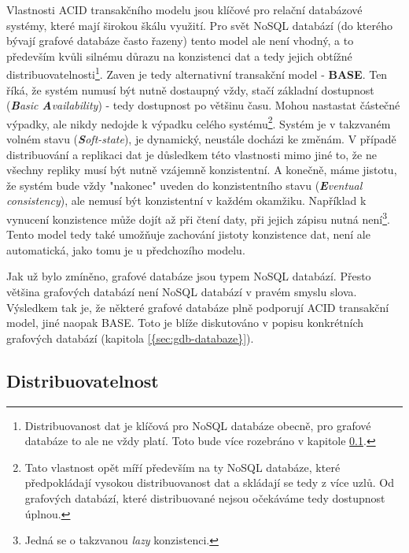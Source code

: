 Vlastnosti ACID transakčního modelu jsou klíčové pro relační databázové systémy, které mají širokou škálu využití. Pro svět NoSQL databází (do kterého bývají grafové databáze často řazeny) tento model ale není vhodný, a to především kvůli silnému důrazu na konzistenci dat a tedy jejich obtížné distribuovatelnosti\footnote{Distribuovanost dat je klíčová pro NoSQL databáze obecně, pro grafové databáze to ale ne vždy platí. Toto bude více rozebráno v kapitole \ref{sec:gdb-distribution}.}. Zaven je tedy alternativní transakční model - \textbf{BASE}. Ten říká, že systém numusí být nutně dostaupný vždy, stačí základní dostupnost (\textit{\textbf{B}asic \textbf{A}vailability}) - tedy dostupnost po většinu času. Mohou nastastat částečné výpadky, ale nikdy nedojde k výpadku celého systému\footnote{Tato vlastnost opět míří především na ty NoSQL databáze, které předpokládají vysokou distribuovanost dat a skládají se tedy z více uzlů. Od grafových databází, které distribuované nejsou očekáváme tedy dostupnost úplnou.}. Systém je v takzvaném volném stavu (\textit{\textbf{S}oft-state}), je dynamický, neustále docházi ke změnám. V případě distribuování a replikaci dat je důsledkem této vlastnosti mimo jiné to, že ne všechny repliky musí být nutně vzájemně konzistentní. A konečně, máme jistotu, že systém bude vždy "nakonec" uveden do konzistentního stavu (\textit{\textbf{E}ventual consistency}), ale nemusí být konzistentní v každém okamžiku. Například k vynucení konzistence může dojít až při čtení daty, při jejich zápisu nutná není\footnote{Jedná se o takzvanou \textit{lazy} konzistenci.}. Tento model tedy také umožňuje zachování jistoty konzistence dat, není ale automatická, jako tomu je u předchozího modelu.

Jak už bylo zmíněno, grafové databáze jsou typem NoSQL databází. Přesto většina grafových databází není NoSQL databází v pravém smyslu slova. Výsledkem tak je, že některé grafové databáze plně podporují ACID transakční model, jiné naopak BASE. Toto je blíže diskutováno v popisu konkrétních grafových databází (kapitola \ref{{sec:gdb-databaze}}). %



\subsection{Distribuovatelnost}
\label{sec:gdb-distribution}

